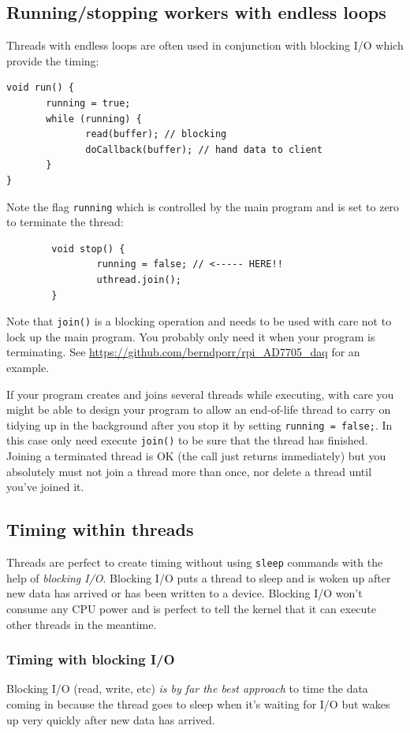 \documentclass[12pt]{report}
\begin{document}
\subsection{Running/stopping workers with endless loops}
Threads with endless loops are often used in conjunction with blocking
I/O which provide the timing:
\begin{verbatim}
void run() {
       running = true;
       while (running) {
              read(buffer); // blocking
              doCallback(buffer); // hand data to client
       }
}
\end{verbatim}
Note the flag \texttt{running} which is controlled by the main program and is set to zero to terminate
the thread:
\begin{verbatim}
        void stop() {
                running = false; // <----- HERE!!
                uthread.join();
        }
\end{verbatim}
Note that \texttt{join()} is a blocking operation and needs to be used with care not to
lock up the main program. You probably only need it when your program is terminating.
See \url{https://github.com/berndporr/rpi_AD7705_daq} for an example.

If your program creates and joins several threads while executing,
with care you might be able to design your program to allow an
end-of-life thread to carry on
tidying up in the background after you stop it by setting \texttt{running = false;}.
In this case only need execute \texttt{join()} to be sure that
the thread has finished. Joining a terminated thread is OK
(the call just returns immediately)
but you absolutely must not join a thread more than once,
nor delete a thread until you've joined it.


\subsection{Timing within threads}
Threads are perfect to create timing without using \texttt{sleep} commands
with the help of \textsl{blocking I/O}. 
Blocking I/O puts a thread
to sleep and is woken up after new data has arrived or has been
written to a device. Blocking I/O won't consume any CPU power
and is perfect to tell the kernel that it can execute other threads
in the meantime.


\subsubsection{Timing with blocking I/O}
Blocking I/O (read, write, etc) \textsl{is by far the best approach} to time
the data coming in because the thread goes to sleep when it's waiting for
I/O but wakes up very quickly after new data has arrived.
\end{document}
